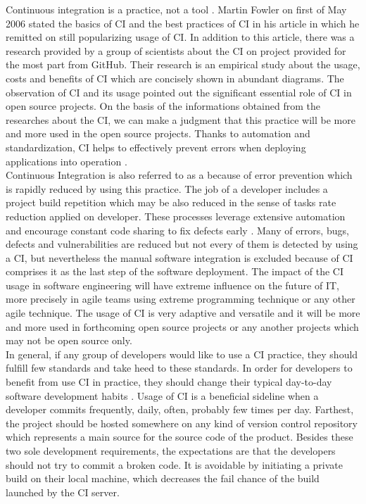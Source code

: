 Continuous integration is a practice, not a tool \cite{CollabNet}. Martin Fowler on first of May 2006 stated the basics of CI and the best practices of CI in his article in which he remitted on still popularizing usage of CI. In addition to this article, there was a research provided by a group of scientists about the CI on project provided for the most part from GitHub. Their research is an empirical study about the usage, costs and benefits of CI which are concisely shown in abundant diagrams. The observation of CI and its usage pointed out the significant essential role of CI in open source projects. On the basis of the informations obtained from the researches about the CI, we can make a judgment that this practice will be more and more used in the open source projects. Thanks to automation and standardization, CI helps to effectively prevent errors when deploying applications into operation \cite{CIcure}.\\

Continuous Integration is also referred to as a  \cite{CIcure} because of error prevention which is rapidly reduced by using this practice. The job of a developer includes a project build repetition which may be also reduced in the sense of tasks rate reduction applied on developer. These processes leverage extensive automation and encourage constant code sharing to fix defects early \cite{DigitalOceanCI}. Many of errors, bugs, defects and vulnerabilities are reduced but not every of them is detected by using a CI, but nevertheless the manual software integration is excluded because of CI comprises it as the last step of the software deployment. The impact of the CI usage in software engineering will have extreme influence on the future of IT, more precisely in agile teams using extreme programming technique or any other agile technique. The usage of CI is very adaptive and versatile and it will be more and more used in forthcoming open source projects or any another projects which may not be open source only.\\

In general, if any group of developers would like to use a CI practice, they should fulfill few standards and take heed to these standards. In order for developers to benefit from use CI in practice, they should change their typical day-to-day software development habits \cite{CIQualityFramework}. Usage of CI is a beneficial sideline when a developer commits frequently, daily, often, probably few times per day. Farthest, the project should be hosted somewhere on any kind of version control repository which represents a main source for the source code of the product. Besides these two sole development requirements, the expectations are that the developers should not try to commit a broken code. It is avoidable by initiating a private build on their local machine, which decreases the fail chance of the build launched by the CI server.\\

